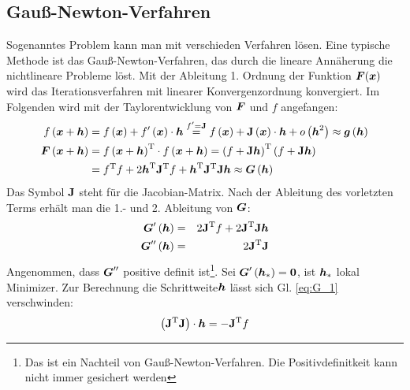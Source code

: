 \subsection{Gauß-Newton-Verfahren}
\label{Gauß-Newton-Verfahren}
Sogenanntes Problem kann man mit verschieden Verfahren lösen. Eine typische Methode ist das Gauß-Newton-Verfahren, das durch die lineare Annäherung die nichtlineare Probleme löst. Mit der Ableitung 1. Ordnung der Funktion $\boldsymbol F(\boldsymbol x)$ wird das Iterationsverfahren mit linearer Konvergenzordnung konvergiert. Im Folgenden wird mit der Taylorentwicklung von $\boldsymbol F$ und $f$ angefangen\cite{madsen2004methods}:
\begin{equation}
\begin{aligned}
f\left ( \boldsymbol x+\boldsymbol h \right ) &= f\left ( \boldsymbol x \right ) + f'\left ( \boldsymbol x \right )\cdot \boldsymbol h \overset{f' = \mathbf{J}}{=} f\left ( \boldsymbol x \right ) + \mathbf{J}\left ( \boldsymbol x \right )\cdot \boldsymbol h + o\left ( \boldsymbol h^{2} \right ) \approx \boldsymbol g\left ( \boldsymbol h \right )\\
\boldsymbol F\left ( \boldsymbol x+\boldsymbol h \right ) &= f\left ( \boldsymbol x+\boldsymbol h \right )^ \mathrm{ T }\cdot f\left ( \boldsymbol x+\boldsymbol h \right )=\left ( f+\mathbf{J}\boldsymbol h \right )^ \mathrm{ T }\left ( f+\mathbf{J}\boldsymbol h \right )\\ &= f^ \mathrm{ T }f+2\boldsymbol h^ \mathrm{ T }\mathbf{J}^ \mathrm{ T }f + \boldsymbol h^ \mathrm{ T }\mathbf{J}^ \mathrm{ T }\mathbf{J}\boldsymbol h \approx \boldsymbol G\left ( \boldsymbol h \right )
\end{aligned}
\end{equation}
Das Symbol $\mathbf{J}$ steht für die Jacobian-Matrix. Nach der Ableitung des vorletzten Terms erhält man die 1.- und 2. Ableitung von $\boldsymbol G$:
\begin{eqnarray}
\boldsymbol G'\left ( \boldsymbol h \right )  &=& 2\mathbf{J}^\mathrm{T}f + 2\mathbf{J}^\mathrm{T}\mathbf{J}\boldsymbol h\label{eq:G_1}\\
\boldsymbol G''\left ( \boldsymbol h \right ) &=& 2\mathbf{J}^\mathrm{T}\mathbf{J}\label{eq:G_2}
\end{eqnarray}
Angenommen, dass $\boldsymbol G''$ positive definit ist\footnote{Das ist ein Nachteil von Gauß-Newton-Verfahren. Die Positivdefinitkeit kann nicht immer gesichert werden}. Sei $\boldsymbol G'\left (\boldsymbol h_{\ast} \right ) = \boldsymbol 0$, ist $\boldsymbol h_{\ast}$ lokal Minimizer. Zur Berechnung die Schrittweite$\boldsymbol h$ lässt sich Gl. \ref{eq:G_1} verschwinden:
\begin{equation}
\left ( \mathbf{J}^\mathrm{T} \mathbf{J} \right ) \cdot \boldsymbol h  = -\mathbf{J}^\mathrm{T}f\label{eq:cal_NW_hs}
\end{equation}
